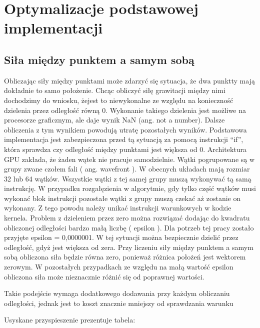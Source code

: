 
\section { Optymalizacje podstawowej implementacji }


\subsection { Siła między punktem a samym sobą }
Obliczając siły między punktami może zdarzyć się sytuacja, że dwa punktty mają dokładnie to samo położenie. Chcąc obliczyć siłę grawitacji między nimi dochodzimy do wniosku, żejest to niewykonalne ze względu na konieczność dzielenia przez odległość równą 0. Wykonanie takiego dzielenia jest możliwe na procesorze graficznym, ale daje wynik NaN (ang. not a number). Dalsze obliczenia z tym wynikiem powodują utratę pozostałych wyników. Podstawowa implementacja jest zabezpieczona przed tą sytuacją za pomocą instrukcji ``if'', która sprawdza czy odległość między punktami jest większa od 0.\linebreak
Architektura GPU zakłada, że żaden wątek nie pracuje samodzielnie. Wątki pogrupowane są w grupy zwane czołem fali ( ang. wavefront ). W obecnych układach mają rozmiar 32 lub 64 wątków. Wszystkie wątki z tej samej grupy muszą wykonywać tą samą instrukcję. W przypadku rozgałęzienia w algorytmie, gdy tylko część wątków musi wykonać blok instrukcji pozostałe wątki z grupy muszą czekać aż zostanie on wykonany. Z tego powodu należy unikać instrukcji warunkowych w kodzie kernela.\linebreak
Problem z dzieleniem przez zero można rozwiązać dodając do kwadratu obliczonej odległości bardzo małą liczbę ( epsilon ). Dla potrzeb tej pracy zostało przyjęte epsilon = 0,0000001. W tej sytuacji można bezpiecznie dzielić przez odległość, gdyż jest większa od zera. Przy liczeniu siły między punktem a samym sobą obliczona siła będzie równa zero, ponieważ różnica położeń jest wektorem zerowym. W pozostałych przypadkach ze względu na małą wartość epsilon obliczona siła może nieznacznie różnić się od poprawnej wartości.

Takie podejście wymaga dodatkowego dodawania przy każdym obliczaniu odległości, jednak jest to koszt znacznie mniejszy od sprawdzania warunku

Usyskane przyspieszenie prezentuje tabela:



